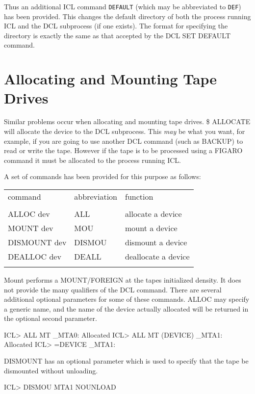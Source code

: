 \documentclass[twoside,11pt,nolof,chapters]{starlink}
\begin{document}
Thus an additional ICL command \verb+DEFAULT+ (which may be abbreviated
to \verb+DEF+) has been provided. This changes the default directory of
both the process running ICL and the DCL subprocess (if one exists). The
format for specifying the directory is exactly the same as that accepted
by the DCL SET DEFAULT command.

\section{Allocating and Mounting Tape Drives}
Similar problems occur when allocating and mounting tape drives.
\$ ALLOCATE will allocate the device to the DCL subprocess. This \emph{may}
be what you want, for example, if you are going to use another DCL
command (such as BACKUP) to read or write the tape. However if the tape
is to be processed using a FIGARO command it must be allocated to the
process running ICL.

A set of commands has been provided for this purpose as follows:

\begin{center}
\begin{tabular}{lll}
\\
command & abbreviation & function\\
\\
ALLOC dev & ALL & allocate a device\\
MOUNT dev & MOU & mount a device\\
DISMOUNT dev & DISMOU & dismount a device\\
DEALLOC dev & DEALL & deallocate a device\\
\\
\end{tabular}
\end{center}
Mount performs a MOUNT/FOREIGN at the tapes initialized density. It does
not provide the many qualifiers of the DCL command. There are several
additional optional parameters for some of these commands. ALLOC may
specify a generic name, and the name of the device actually allocated
will be returned in the optional second parameter.
\begin{terminalv}

    ICL> ALL MT
    _MTA0: Allocated
    ICL> ALL MT (DEVICE)
    _MTA1: Allocated
    ICL> =DEVICE
    _MTA1:

\end{terminalv}
DISMOUNT has an optional parameter which is used to specify that the
tape be dismounted without unloading.
\begin{terminalv}

    ICL> DISMOU MTA1 NOUNLOAD

\end{terminalv}
\end{document}
